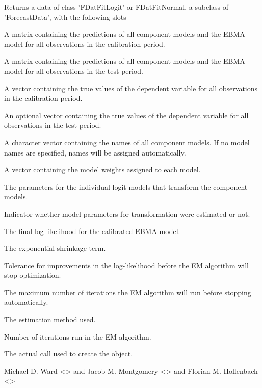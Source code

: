 \documentclass[a4paper]{book}
\begin{document}
%
\begin{Value}
Returns a data of class 'FDatFitLogit' or FDatFitNormal, a subclass of 'ForecastData', with the following slots
\begin{ldescription}
\item[\code{predCalibration}] A matrix containing the predictions of all component models and the EBMA model for all observations in the calibration period.
\item[\code{predTest}] A matrix containing the predictions of all component models and the EBMA model for all observations in the test period.
\item[\code{outcomeCalibration}] A vector containing the true values of the dependent variable for all observations in the calibration period.
\item[\code{outcomeTest}] An optional vector containing the true values of the dependent variable for all observations in the test period.
\item[\code{modelNames}] A character vector containing the names of all component models.  If no model names are specified, names will be assigned automatically.
\item[\code{modelWeights}] A vector containing the model weights assigned to each model.
\item[\code{modelParams}] The parameters for the individual logit models that transform the component models.
\item[\code{useModelParams}] Indicator whether model parameters for transformation were estimated or not.
\item[\code{logLik}] The final log-likelihood for the calibrated EBMA model.
\item[\code{exp}] The exponential shrinkage term.
\item[\code{tol}] Tolerance for improvements in the log-likelihood before the EM algorithm will stop optimization.
\item[\code{maxIter}] The maximum number of iterations the EM algorithm will run before stopping automatically.
\item[\code{method}] The estimation method used. 
\item[\code{iter}] Number of iterations run in the EM algorithm.
\item[\code{call}] The actual call used to create the object.
\end{ldescription}
\end{Value}
%
\begin{Author}\relax
Michael D. Ward <> and Jacob M. Montgomery <> and Florian M. Hollenbach <>
\end{Author}
\end{document}
